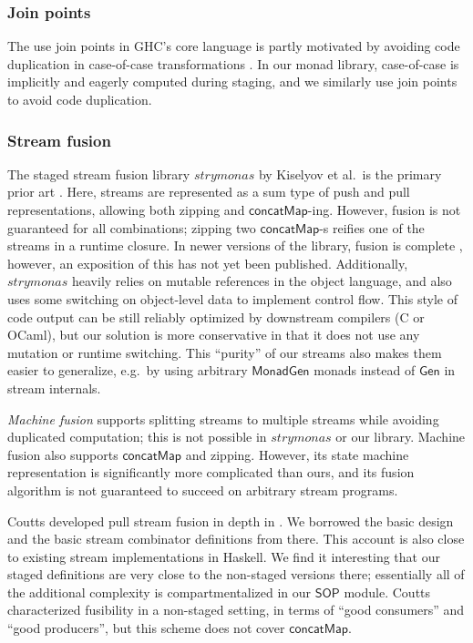 \documentclass[acmsmall]{acmart}
\newcommand{\msf}[1]{{\mathsf{#1}}}
\newcommand{\SOP}{\msf{SOP}}
\newcommand{\concatMap}{\msf{concatMap}}
\theoremstyle{remark}
\newcommand{\Gen}{\msf{Gen}}
\newcommand{\MonadGen}{\msf{MonadGen}}
\begin{document}
\subsubsection*{Join points}
The use join points in GHC's core language is partly motivated by avoiding code
duplication in case-of-case transformations
\cite{DBLP:conf/pldi/MaurerDAJ17}. In our monad library, case-of-case is
implicitly and eagerly computed during staging, and we similarly use join points
to avoid code duplication.

\subsubsection*{Stream fusion}
The staged stream fusion library $\mathit{strymonas}$ by Kiselyov et al.\ is the
primary prior art \cite{DBLP:conf/popl/KiselyovBPS17}. Here, streams are
represented as a sum type of push and pull representations, allowing both
zipping and $\concatMap$-ing. However, fusion is not guaranteed for all
combinations; zipping two $\concatMap$-s reifies one of the streams in a runtime
closure. In newer versions of the library, fusion is complete
\cite{DBLP:conf/pepm/0001K24}, however, an exposition of this has not yet been
published. Additionally, $\mathit{strymonas}$ heavily relies on mutable
references in the object language, and also uses some switching on object-level
data to implement control flow. This style of code output can be still reliably
optimized by downstream compilers (C or OCaml), but our solution is more
conservative in that it does not use any mutation or runtime switching.
This ``purity'' of our streams also makes them easier to generalize, e.g.\
by using arbitrary $\MonadGen$ monads instead of $\Gen$ in stream internals.

\emph{Machine fusion} \cite{DBLP:conf/ppdp/RobinsonL17} supports splitting
streams to multiple streams while avoiding duplicated computation; this is not
possible in $\mathit{strymonas}$ or our library. Machine fusion also supports
$\concatMap$ and zipping. However, its state machine representation is
significantly more complicated than ours, and its fusion algorithm is not
guaranteed to succeed on arbitrary stream programs.

Coutts developed pull stream fusion in depth in
\cite{DBLP:phd/ethos/Coutts11}. We borrowed the basic design and the basic
stream combinator definitions from there. This account is also close to existing
stream implementations in Haskell. We find it interesting that our staged
definitions are very close to the non-staged versions there; essentially all of
the additional complexity is compartmentalized in our $\SOP$ module.  Coutts
characterized fusibility in a non-staged setting, in terms of ``good consumers''
and ``good producers'', but this scheme does not cover $\concatMap$.
\end{document}
